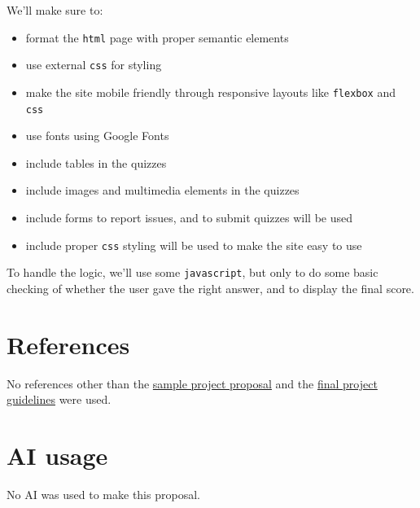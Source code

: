 \documentclass[12pt, a4paper, titlepage]{article}
\begin{document}
 We'll make sure to: 

  \begin{itemize}
    \item format the \texttt{html} page with proper semantic elements
    \item use external \texttt{css} for styling 
    \item make the site mobile friendly through responsive layouts like \texttt{flexbox} and \texttt{css}
    \item use fonts using Google Fonts
    \item include tables in the quizzes
    \item include images and multimedia elements in the quizzes
    \item include forms to report issues, and to submit quizzes will be used
    \item include proper \texttt{css} styling will be used to make the site easy to use
  \end{itemize}


  To handle the logic, we'll use some \texttt{javascript}, but only to do some basic checking of whether the user gave the right answer, and to display the final score. 


\section*{References}

No references other than the \href{https://aupp.instructure.com/courses/4360/files/621169?wrap=1}{sample project proposal} and the \href{https://aupp.instructure.com/courses/4360/files/610452?wrap=1}{final project guidelines} were used.

\section*{AI usage}

No AI was used to make this proposal.
\end{document}
